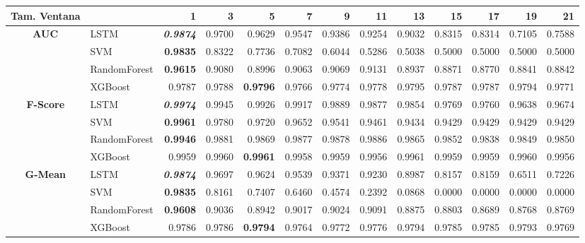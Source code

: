 \begin{table}[H]
	\centering
	\begin{adjustbox}{max width=12cm}
		\begin{tabular}{|c|l|r|r|r|r|r|r|r|r|r|r|r|}
			\hline
			\textbf{Tam. Ventana}&         &      1  &      3  &      5  &      7  &      9  &      11 &      13 &      15 &      17 &      19 &      21 \\
			\hline
			\textbf{AUC} &  LSTM & \textit{ \textbf{  0.9874 } } &  0.9700 &  0.9629 &  0.9547 &  0.9386 &  0.9254 &  0.9032 &  0.8315 &  0.8314 &  0.7105 &  0.7588 \\
			&  SVM & \textbf{  0.9835 } &  0.8322 &  0.7736 &  0.7082 &  0.6044 &  0.5286 &  0.5038 &  0.5000 &  0.5000 &  0.5000 &  0.5000 \\
			&  RandomForest & \textbf{  0.9615 } &  0.9080 &  0.8996 &  0.9063 &  0.9069 &  0.9131 &  0.8937 &  0.8871 &  0.8770 &  0.8841 &  0.8842 \\
			&  XGBoost &  0.9787 &  0.9788 & \textbf{  0.9796 } &  0.9766 &  0.9774 &  0.9778 &  0.9795 &  0.9787 &  0.9787 &  0.9794 &  0.9771 \\
			\hline
			\textbf{F-Score} &  LSTM & \textit{ \textbf{  0.9974 } } &  0.9945 &  0.9926 &  0.9917 &  0.9889 &  0.9877 &  0.9854 &  0.9769 &  0.9760 &  0.9638 &  0.9674 \\
			&  SVM & \textbf{  0.9961 } &  0.9780 &  0.9720 &  0.9652 &  0.9541 &  0.9461 &  0.9434 &  0.9429 &  0.9429 &  0.9429 &  0.9429 \\
			&  RandomForest & \textbf{  0.9946 } &  0.9881 &  0.9869 &  0.9877 &  0.9878 &  0.9886 &  0.9865 &  0.9852 &  0.9838 &  0.9849 &  0.9850 \\
			&  XGBoost &  0.9959 &  0.9960 & \textbf{  0.9961 } &  0.9958 &  0.9959 &  0.9956 &  0.9961 &  0.9959 &  0.9959 &  0.9960 &  0.9956 \\
			\hline
			\textbf{G-Mean} &  LSTM & \textit{ \textbf{  0.9874 } } &  0.9697 &  0.9624 &  0.9539 &  0.9371 &  0.9230 &  0.8987 &  0.8157 &  0.8159 &  0.6511 &  0.7226 \\
			&  SVM & \textbf{  0.9835 } &  0.8161 &  0.7407 &  0.6460 &  0.4574 &  0.2392 &  0.0868 &  0.0000 &  0.0000 &  0.0000 &  0.0000 \\
			&  RandomForest & \textbf{  0.9608 } &  0.9036 &  0.8942 &  0.9017 &  0.9024 &  0.9091 &  0.8875 &  0.8803 &  0.8689 &  0.8768 &  0.8769 \\
			&  XGBoost &  0.9786 &  0.9786 & \textbf{  0.9794 } &  0.9764 &  0.9772 &  0.9776 &  0.9794 &  0.9785 &  0.9785 &  0.9793 &  0.9769 \\

\end{tabular}
\end{adjustbox}
\end{table}
